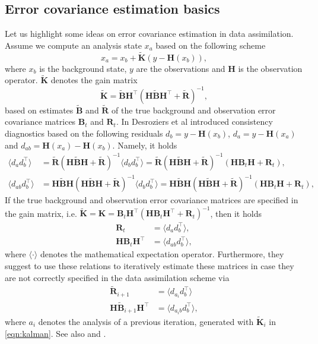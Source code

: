 \documentclass[a4paper,10pt]{article}
\numberwithin{equation}{section}
\begin{document}
\subsection{Error covariance estimation basics }
Let us highlight some ideas on error covariance estimation in data assimilation. 
Assume we compute an analysis state $x_a$ based on the following scheme 
\begin{equation}
\label{eqn:kalman}
x_a=x_b+\tilde{\mathbf K}(y-\mathbf H(x_b)),
\end{equation}
where $x_b$ is the background state, $y$ are the observations and $\mathbf H$ is the observation operator. $\tilde{\mathbf K}$ denotes the gain matrix 
\begin{equation*}
\tilde{\mathbf K}=\tilde{\mathbf B} \mathbf H^\top(\mathbf H \tilde{\mathbf B}\mathbf H^\top+\tilde{\mathbf R})^{-1},
\end{equation*}
based on estimates $\tilde{\mathbf B}$ and $\tilde{\mathbf R}$ of the true background and observation error covariance matrices $\mathbf B_t$ and $\mathbf R_t$. In \cite{desroziers} Desroziers et al introduced consistency diagnostics based on the following residuals
$d_b=y-\mathbf H(x_b)$, $d_a=y-\mathbf H(x_a)$ and $d_{ab}=\mathbf H(x_a)-\mathbf H(x_b)$. Namely, it holds 
\begin{align*}
\langle d_ad_b^\top \rangle &= \tilde {\mathbf R}(\mathbf H \tilde{\mathbf B}\mathbf H+\tilde{\mathbf R})^{-1}\langle d_bd_b^\top \rangle 
= \tilde {\mathbf R}(\mathbf H \tilde{\mathbf B}\mathbf H+\tilde{\mathbf R})^{-1}(\mathbf H \mathbf B_t\mathbf H+\mathbf R_t),\\
\langle d_{ab}d_b^\top \rangle &= \mathbf H\tilde {\mathbf B}\mathbf H(\mathbf H \tilde{\mathbf B}\mathbf H+\tilde{\mathbf R})^{-1}\langle d_bd_b^\top \rangle 
=  \mathbf H\tilde {\mathbf B}\mathbf H(\mathbf H \tilde{\mathbf B}\mathbf H+\tilde{\mathbf R})^{-1}(\mathbf H \mathbf B_t\mathbf H+\mathbf R_t),
\end{align*}
If the true background and observation error covariance matrices are specified in the gain matrix, i.e. $\tilde{\mathbf K}=\mathbf K=\mathbf B_t \mathbf H^\top(\mathbf H \mathbf B_t\mathbf H^\top+\mathbf R_t)^{-1}$, then it holds
\begin{align*}
\mathbf R_t&= \langle d_ad_b^\top\rangle,\\
\mathbf H\mathbf B_t\mathbf H^\top&=\langle d_{ab}d_b^\top\rangle,
\end{align*}
where $\langle \cdot \rangle$ denotes the mathematical expectation operator. 
 Furthermore, they suggest to use these relations to iteratively estimate these matrices in case they are not correctly specified in the data assimilation scheme via 
 \begin{align*}
 \tilde {\mathbf R}_{i+1}&= \langle d_{a_i}d_b^\top\rangle\\
\mathbf H\tilde {\mathbf B}_{i+1}\mathbf H^\top&=\langle d_{a_ib}d_b^\top\rangle,
 \end{align*}
 where $a_i$ denotes the analysis of a previous iteration, generated with $\tilde{\mathbf K}_i$  in \eqref{eqn:kalman}. 
 See also \cite{menard} and  \cite{gauthier}.
\end{document}
